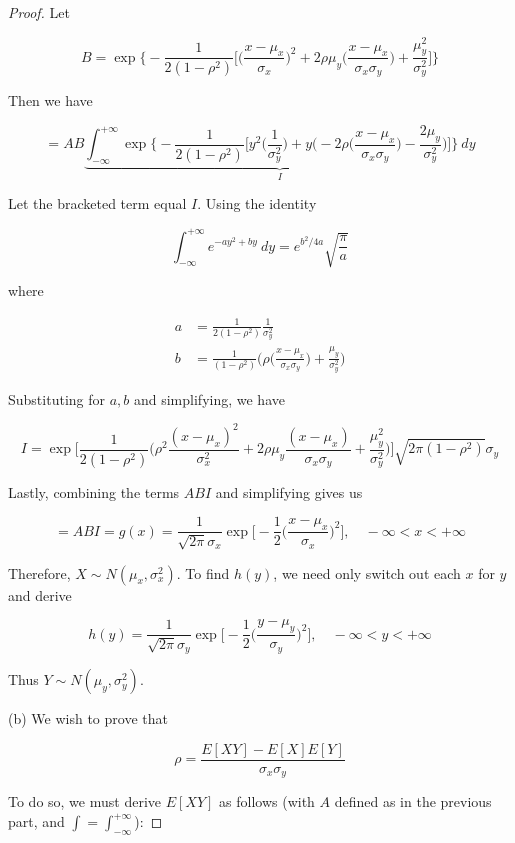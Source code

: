 \documentclass[10pt, oneside]{article}   	%
\theoremstyle{definition}
\begin{document}
\begin{enumerate}[label=9.\arabic*]
\begin{proof}
Let

\[ B = \exp \bigg\{-\frac{1}{2(1-\rho^2)} \bigg[ \bigg( \frac{x - \mu_x}{\sigma_x} \bigg)^2 + 2 \rho \mu_y \bigg( \frac{x - \mu_x}{\sigma_x \sigma_y} \bigg) + \frac{\mu^2_y}{\sigma^2_y} \bigg] \bigg\} \]

Then we have

\[ = AB \underbrace{\int^{+\infty}_{-\infty} \exp \bigg\{ -\frac{1}{2(1-\rho^2)} \bigg[ y^2 \bigg( \frac{1}{\sigma^2_y} \bigg) + y \bigg( -2\rho \bigg( \frac{x-\mu_x}{\sigma_x \sigma_y} \bigg) - \frac{2\mu_y}{\sigma^2_y} \bigg) \bigg] \bigg\} \ dy}_{I} \]

Let the bracketed term equal $I$. Using the identity

\[ \int^{+\infty}_{-\infty} e^{-ay^2 + by} \ dy = e^{b^2/4a} \sqrt{\frac{\pi}{a}} \]

where

\begin{align*}
a &= \frac{1}{2(1-\rho^2)} \frac{1}{\sigma^2_y} \\
b &= \frac{1}{(1-\rho^2)} \bigg( \rho \bigg( \frac{x-\mu_x}{\sigma_x \sigma_y} \bigg) + \frac{\mu_y}{\sigma^2_y} \bigg)
\end{align*}

Substituting for $a, b$ and simplifying, we have

\[ I = \exp \bigg[ \frac{1}{2(1-\rho^2)} \bigg( \rho^2 \frac{(x-\mu_x)^2}{\sigma^2_x} + 2\rho \mu_y \frac{(x-\mu_x)}{\sigma_x \sigma_y} + \frac{\mu^2_y}{\sigma^2_y} \bigg) \bigg] \sqrt{2\pi (1-\rho^2)} \sigma_y \]

Lastly, combining the terms $ABI$ and simplifying gives us

\[ = ABI = \boxed{ g(x) = \frac{1}{\sqrt{2\pi} \sigma_x} \exp \bigg[ -\frac{1}{2} \bigg( \frac{x-\mu_x}{\sigma_x} \bigg)^2 \bigg], \quad -\infty < x < +\infty } \]

Therefore, $\boxed{X \sim N(\mu_x, \sigma^2_x)}$. To find $h(y)$, we need only switch out each $x$ for $y$ and derive

\[ \boxed{ h(y) = \frac{1}{\sqrt{2\pi} \sigma_y} \exp \bigg[ -\frac{1}{2} \bigg( \frac{y-\mu_y}{\sigma_y} \bigg)^2 \bigg], \quad -\infty < y < +\infty } \]

Thus $\boxed{Y \sim N(\mu_y, \sigma^2_y)}$.

(b) We wish to prove that

\[ \rho = \frac{E[XY] - E[X]E[Y]}{\sigma_x \sigma_y} \]

To do so, we must derive $E[XY]$ as follows (with $A$ defined as in the previous part, and $\int = \int^{+\infty}_{-\infty}$):


\end{proof}
\end{enumerate}
\end{document}
